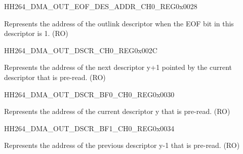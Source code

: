     
    \begin{register}{H}{H264\_DMA\_OUT\_EOF\_DES\_ADDR\_CH0\_REG}{0x0028}\label{regdesc:H264DMAOUTEOFDESADDRCH0REG}
    \regnewline%
    \begin{regdesc}\begin{reglist}
    \label{fielddesc:H264DMAOUTEOFDESADDRCH0}\item [H264\_DMA\_OUT\_EOF\_DES\_ADDR\_CH0] Represents the address of the outlink descriptor when the EOF bit in this descriptor is 1. (RO)
    \end{reglist}\end{regdesc}
    \end{register}
    
    
    \begin{register}{H}{H264\_DMA\_OUT\_DSCR\_CH0\_REG}{0x002C}\label{regdesc:H264DMAOUTDSCRCH0REG}
    \regnewline%
    \begin{regdesc}\begin{reglist}
    \label{fielddesc:H264DMAOUTLINKDSCRCH0}\item [H264\_DMA\_OUTLINK\_DSCR\_CH0] Represents the address of the next descriptor y+1 pointed by the current descriptor that is pre-read. (RO)
    \end{reglist}\end{regdesc}
    \end{register}
    
    
    \begin{register}{H}{H264\_DMA\_OUT\_DSCR\_BF0\_CH0\_REG}{0x0030}\label{regdesc:H264DMAOUTDSCRBF0CH0REG}
    \regnewline%
    \begin{regdesc}\begin{reglist}
    \label{fielddesc:H264DMAOUTLINKDSCRBF0CH0}\item [H264\_DMA\_OUTLINK\_DSCR\_BF0\_CH0] Represents the address of the current descriptor y that is pre-read. (RO)
    \end{reglist}\end{regdesc}
    \end{register}
    
    
    \begin{register}{H}{H264\_DMA\_OUT\_DSCR\_BF1\_CH0\_REG}{0x0034}\label{regdesc:H264DMAOUTDSCRBF1CH0REG}
    \regnewline%
    \begin{regdesc}\begin{reglist}
    \label{fielddesc:H264DMAOUTLINKDSCRBF1CH0}\item [H264\_DMA\_OUTLINK\_DSCR\_BF1\_CH0] Represents the address of the previous descriptor y-1 that is pre-read. (RO)
    \end{reglist}\end{regdesc}
    \end{register}
    

